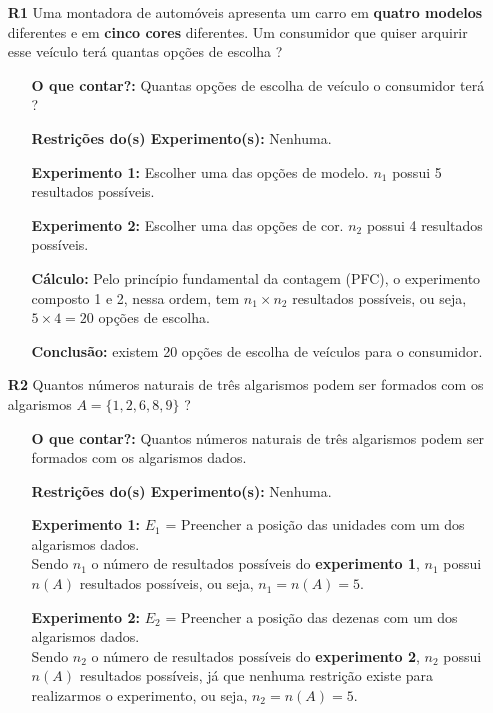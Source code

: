 \documentclass[a4paper,12pt]{article}
\begin{document}
\begin{enumerate}

\item[\textbf{R1}] Uma montadora de automóveis apresenta um carro em \textbf{quatro modelos} diferentes e em \textbf{cinco cores} diferentes. Um consumidor que quiser arquirir esse veículo terá quantas opções de escolha ?

  \begin{itemize}
    \item[\ding{172}] \textbf{O que contar?:} Quantas opções de escolha de veículo o consumidor terá ?
    \item[\ding{173}] \textbf{Restrições do(s) Experimento(s):} Nenhuma.
    \item[\ding{174}] \textbf{Experimento 1:} Escolher uma das opções de modelo. $n_{1}$ possui 5 resultados possíveis.
    \item[\ding{175}] \textbf{Experimento 2:} Escolher uma das opções de cor. $n_{2}$ possui 4 resultados possíveis.
    \item[\ding{176}] \textbf{Cálculo:} Pelo princípio fundamental da contagem (PFC), o experimento composto 1 e 2, nessa ordem, tem $n_{1} \times n_{2}$ resultados possíveis, ou seja, $5 \times 4 = 20$ opções de escolha.
    \item[\ding{177}] \textbf{Conclusão:}  existem 20 opções de escolha de veículos para o consumidor.
  \end{itemize}
  
  \newpage

\item[\textbf{R2}] Quantos números naturais de três algarismos podem ser formados com os algarismos $A = \{1, 2, 6, 8, 9\}$ ?
   \begin{itemize}
    \item[\ding{172}] \textbf{O que contar?:} Quantos números naturais de três algarismos podem ser formados com os algarismos dados.
    \item[\ding{173}] \textbf{Restrições do(s) Experimento(s):} Nenhuma.
    \item[\ding{174}] \textbf{Experimento 1:} $E_1$ = Preencher a posição das unidades com um dos algarismos dados.\\ Sendo $n_{1}$ o número de resultados possíveis do \textbf{experimento 1}, $n_{1}$ possui $n(A)$ resultados possíveis, ou seja, $n_{1} = n(A) = 5$.
    
    \item[\ding{175}] \textbf{Experimento 2:} $E_2$ = Preencher a posição das dezenas com um dos algarismos dados.\\ Sendo $n_{2}$ o número de resultados possíveis do \textbf{experimento 2}, $n_{2}$ possui $n(A)$ resultados possíveis, já que nenhuma restrição existe para realizarmos o experimento, ou seja, $n_{2} = n(A) = 5$.
    

\end{itemize}
\end{enumerate}
\end{document}
